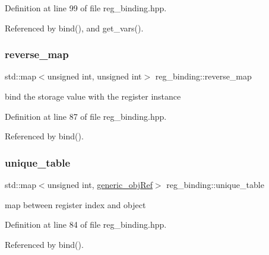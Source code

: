 Definition at line 99 of file reg\+\_\+binding.\+hpp.



Referenced by bind(), and get\+\_\+vars().

\mbox{\label{classreg__binding_a4de12bf39febad6cedc31610bf432c0d}} 
\subsubsection{\texorpdfstring{reverse\+\_\+map}{reverse\_map}}
{\footnotesize\ttfamily std\+::map$<$unsigned int, unsigned int$>$ reg\+\_\+binding\+::reverse\+\_\+map\hspace{0.3cm}{\ttfamily [protected]}}



bind the storage value with the register instance 



Definition at line 87 of file reg\+\_\+binding.\+hpp.



Referenced by bind().

\mbox{\label{classreg__binding_a2fccab59e8e8657e60998633aa791de9}} 
\subsubsection{\texorpdfstring{unique\+\_\+table}{unique\_table}}
{\footnotesize\ttfamily std\+::map$<$unsigned int, \hyperlink{generic__obj_8hpp_acb533b2ef8e0fe72e09a04d20904ca81}{generic\+\_\+obj\+Ref}$>$ reg\+\_\+binding\+::unique\+\_\+table\hspace{0.3cm}{\ttfamily [protected]}}



map between register index and object 



Definition at line 84 of file reg\+\_\+binding.\+hpp.



Referenced by bind().

\mbox{\label{classreg__binding_acce1c14e8ad516225ed5a39b25d89c72}} 

